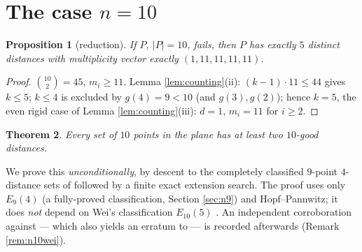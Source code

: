 \documentclass[11pt]{article}
\newtheorem{theorem}{Theorem}[section]
\newtheorem{proposition}[theorem]{Proposition}
\theoremstyle{definition}
\theoremstyle{remark}
\begin{document}
\section{The case $n = 10$}\label{sec:n10}

\begin{proposition}[reduction]\label{prop:n10red}
If $P$, $|P| = 10$, fails, then $P$ has exactly $5$ distinct distances with multiplicity
vector exactly $(1, 11, 11, 11, 11)$.
\end{proposition}

\begin{proof}
$\binom{10}{2} = 45$, $m_i \ge 11$. Lemma \ref{lem:counting}(ii): $(k-1) \cdot 11 \le 44$
gives $k \le 5$; $k \le 4$ is excluded by $g(4) = 9 < 10$ (and $g(3), g(2)$); hence
$k = 5$, the even rigid case of Lemma \ref{lem:counting}(iii): $d = 1$,
$m_i = 11$ for $i \ge 2$.
\end{proof}

\begin{theorem}\label{thm:n10}
Every set of $10$ points in the plane has at least two $10$-good distances.
\end{theorem}

We prove this \emph{unconditionally}, by descent to the completely classified $9$-point
$4$-distance sets of \cite[Theorem~1]{ErFi96} followed by a finite exact extension search.
The proof uses only $E_9(4)$ (a fully-proved classification, Section \ref{sec:n9}) and
Hopf--Pannwitz; it does \emph{not} depend on Wei's classification $E_{10}(5)$ \cite{Wei12}.
An independent corroboration against \cite[Theorem~11]{Wei12} --- which also yields an
erratum to \cite{Wei12} --- is recorded afterwards (Remark \ref{rem:n10wei}).
\end{document}
